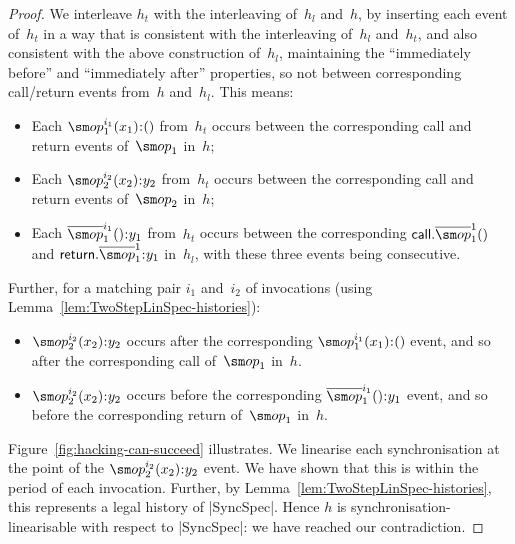 \begin{proof}
We interleave $h_t$ with the interleaving of~$h_l$ and~$h$, by inserting each
event of~$h_t$ in a way that is consistent with the interleaving of~$h_l$
and~$h_t$, and also consistent with the above construction of~$h_l$, maintaining
the ``immediately before'' and ``immediately after'' properties, so not
between corresponding call/return events from~$h$ and~$h_l$.  This means:
%
\begin{itemize}
\item Each $\op_1^{i_1}(x_1)\::()$ from~$h_t$ occurs between the corresponding
  call and return events of~$\op_1$ in~$h$;

\item Each $\op_2^{i_2}(x_2)\::y_2$ from~$h_t$ occurs between the
  corresponding call and return events of~$\op_2$ in~$h$;

\item Each $\overline{\op}_1^{i_1}()\::y_1$ from~$h_t$  occurs
  between the corresponding $\call.\overline{\op}_1^1()$ and
  $\return.\overline{\op}_1^1\::y_1$ in~$h_l$, with these three events being
  consecutive.
\end{itemize}
%
Further, for a matching pair $i_1$ and~$i_2$ of invocations (using
Lemma~\ref{lem:TwoStepLinSpec-histories}):
%
\begin{itemize}
\item $\op_2^{i_2}(x_2)\::y_2$ occurs after the corresponding
  $\op_1^{i_1}(x_1)\::()$ event, and so after the corresponding call
  of~$\op_1$ in~$h$.

\item $\op_2^{i_2}(x_2)\::y_2$ occurs before the corresponding
  $\overline\op_1^{i_1}()\::y_1$ event, and so before the corresponding return
  of~$\op_1$ in~$h$.
\end{itemize}
%
Figure~\ref{fig:hacking-can-succeed} illustrates.  We linearise each
synchronisation at the point of the $\op_2^{i_2}(x_2)\::y_2$ event.  We have
shown that this is within the period of each invocation.  Further, by
Lemma~\ref{lem:TwoStepLinSpec-histories}, this represents a legal history of
|SyncSpec|.  Hence $h$ is synchronisation-linearisable with respect to
|SyncSpec|: we have reached our contradiction.
\end{proof}


